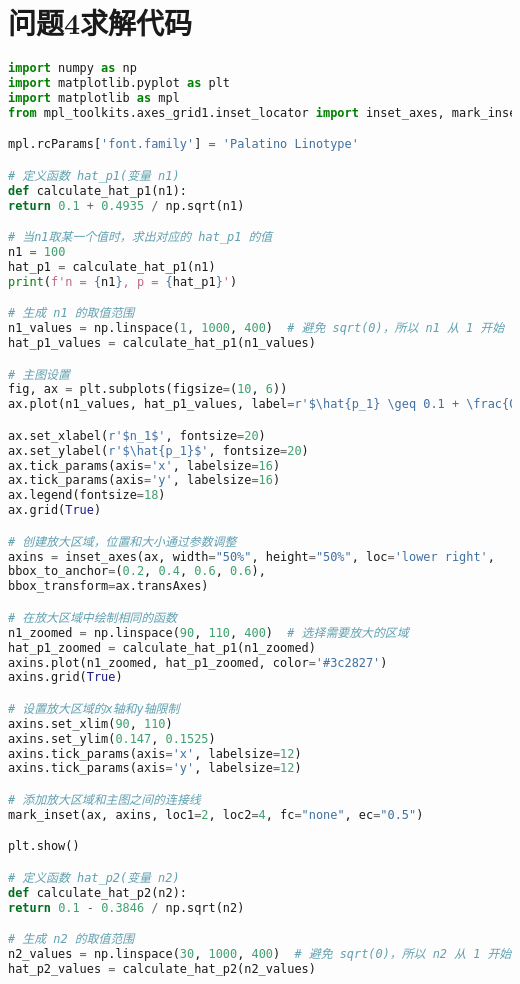 \documentclass[withoutpreface,bwprint]{cumcmthesis} %
\begin{document}
 \section{问题4求解代码}
 \begin{lstlisting}[language=python]
import numpy as np
import matplotlib.pyplot as plt
import matplotlib as mpl
from mpl_toolkits.axes_grid1.inset_locator import inset_axes, mark_inset

mpl.rcParams['font.family'] = 'Palatino Linotype'

# 定义函数 hat_p1(变量 n1)
def calculate_hat_p1(n1):
return 0.1 + 0.4935 / np.sqrt(n1)

# 当n1取某一个值时，求出对应的 hat_p1 的值
n1 = 100
hat_p1 = calculate_hat_p1(n1)
print(f'n = {n1}, p = {hat_p1}')

# 生成 n1 的取值范围
n1_values = np.linspace(1, 1000, 400)  # 避免 sqrt(0)，所以 n1 从 1 开始
hat_p1_values = calculate_hat_p1(n1_values)

# 主图设置
fig, ax = plt.subplots(figsize=(10, 6))
ax.plot(n1_values, hat_p1_values, label=r'$\hat{p_1} \geq 0.1 + \frac{0.4935}{\sqrt{n_1}}$', color='#3c2827')

ax.set_xlabel(r'$n_1$', fontsize=20)
ax.set_ylabel(r'$\hat{p_1}$', fontsize=20)
ax.tick_params(axis='x', labelsize=16)
ax.tick_params(axis='y', labelsize=16)
ax.legend(fontsize=18)
ax.grid(True)

# 创建放大区域，位置和大小通过参数调整
axins = inset_axes(ax, width="50%", height="50%", loc='lower right',
bbox_to_anchor=(0.2, 0.4, 0.6, 0.6),
bbox_transform=ax.transAxes)

# 在放大区域中绘制相同的函数
n1_zoomed = np.linspace(90, 110, 400)  # 选择需要放大的区域
hat_p1_zoomed = calculate_hat_p1(n1_zoomed)
axins.plot(n1_zoomed, hat_p1_zoomed, color='#3c2827')
axins.grid(True)

# 设置放大区域的x轴和y轴限制
axins.set_xlim(90, 110)
axins.set_ylim(0.147, 0.1525)
axins.tick_params(axis='x', labelsize=12)
axins.tick_params(axis='y', labelsize=12)

# 添加放大区域和主图之间的连接线
mark_inset(ax, axins, loc1=2, loc2=4, fc="none", ec="0.5")

plt.show()

# 定义函数 hat_p2(变量 n2)
def calculate_hat_p2(n2):
return 0.1 - 0.3846 / np.sqrt(n2)

# 生成 n2 的取值范围
n2_values = np.linspace(30, 1000, 400)  # 避免 sqrt(0)，所以 n2 从 1 开始
hat_p2_values = calculate_hat_p2(n2_values)


\end{lstlisting}
\end{document}
